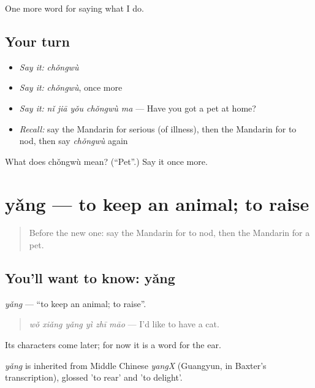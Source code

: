 \begin{grammarlens}[title={What you've built}]
One more word for saying what I do.
\end{grammarlens}

\subsection*{Your turn}
\begin{itemize}
\raggedright
  \item \emph{Say it:} \emph{chǒngwù}
  \item \emph{Say it:} \emph{chǒngwù}, once more
  \item \emph{Say it:} \emph{nǐ jiā yǒu chǒngwù ma} — Have you got a pet at home?
  \item \emph{Recall:} say the Mandarin for serious (of illness), then the Mandarin for to nod, then say \emph{chǒngwù} again
\end{itemize}

\begin{tcolorbox}[breakable,colback=teal!4,colframe=teal!35!black,title={Before you move on}]
What does chǒngwù mean? (\textquotedblleft{}Pet\textquotedblright{}.) Say it once more.
\end{tcolorbox}
\section[yǎng]{yǎng — to keep an animal; to raise}

\label{lesson:ZH-C229-yang}



\begin{quote}
Before the new one: say the Mandarin for to nod, then the Mandarin for a pet.
\end{quote}

\subsection*{You'll want to know: yǎng}
\emph{yǎng} — \textquotedblleft{}to keep an animal; to raise\textquotedblright{}.

\begin{quote}
\emph{wǒ xiǎng yǎng yì zhī māo} — I'd like to have a cat.
\end{quote}

Its characters come later; for now it is a word for the ear.

\begin{cousinweb}
\emph{yǎng} is inherited from Middle Chinese \emph{yangX} (Guangyun, in Baxter's transcription), glossed 'to rear' and 'to delight'.
\end{cousinweb}

